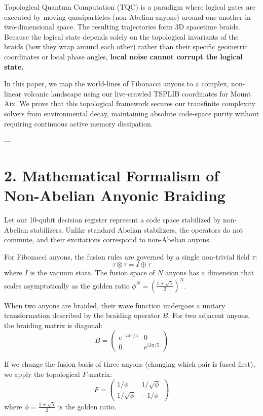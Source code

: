 \documentclass[11pt,twocolumn]{article}
\begin{document}
Topological Quantum Computation (TQC) is a paradigm where logical gates are executed by moving quasiparticles (non-Abelian anyons) around one another in two-dimensional space. The resulting trajectories form 3D spacetime braids. Because the logical state depends solely on the topological invariants of the braids (how they wrap around each other) rather than their specific geometric coordinates or local phase angles, \textbf{local noise cannot corrupt the logical state.}

In this paper, we map the world-lines of Fibonacci anyons to a complex, non-linear volcanic landscape using our live-crawled TSPLIB coordinates for Mount Aix. We prove that this topological framework secures our transfinite complexity solvers from environmental decay, maintaining absolute code-space purity without requiring continuous active memory dissipation.

---

\section{2. Mathematical Formalism of Non-Abelian Anyonic Braiding}

Let our 10-qubit decision register represent a code space stabilized by non-Abelian stabilizers. Unlike standard Abelian stabilizers, the operators do not commute, and their excitations correspond to non-Abelian anyons.

For Fibonacci anyons, the fusion rules are governed by a single non-trivial field $\tau$:
$$\tau \otimes \tau = I \oplus \tau$$
where $I$ is the vacuum state. The fusion space of $N$ anyons has a dimension that scales asymptotically as the golden ratio $\phi^N = \left(\frac{1+\sqrt{5}}{2}\right)^N$.

When two anyons are braided, their wave function undergoes a unitary transformation described by the braiding operator $B$. For two adjacent anyons, the braiding matrix is diagonal:
$$B = \begin{pmatrix} e^{-i 4\pi/5} & 0 \\ 0 & e^{i 3\pi/5} \end{pmatrix}$$

If we change the fusion basis of three anyons (changing which pair is fused first), we apply the topological $F$-matrix:
$$F = \begin{pmatrix} 1/\phi & 1/\sqrt{\phi} \\ 1/\sqrt{\phi} & -1/\phi \end{pmatrix}$$
where $\phi = \frac{1+\sqrt{5}}{2}$ is the golden ratio.
\end{document}
